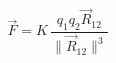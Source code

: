 \documentclass[preview]{standalone}
\begin{document}
\begin{align*}
\vec{F} = K \, \dfrac{q_1 q_2 \vec{R}_{12}}{\lVert \vec{R}_{12} \rVert^3}
\end{align*}
\end{document}
